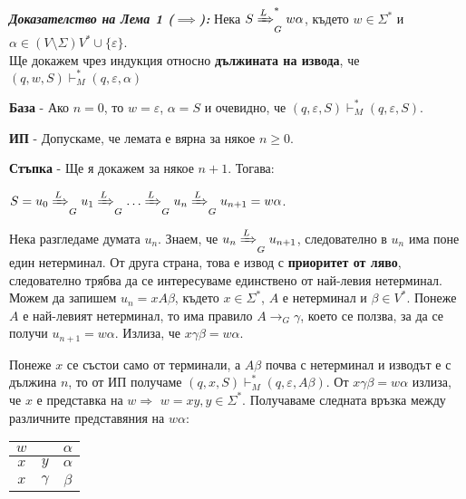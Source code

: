 \documentclass[fleqn,12pt]{article}
\begin{document}
\noindent\textit{\textbf{Доказателство на Лема 1 ($\implies$):}} 
Нека $S \xRightarrow[]{L}_G^* w\alpha$, където $w \in \Sigma^*$ и $\alpha \in (V \setminus \Sigma) V^* \cup \{\varepsilon\}$. \\
Ще докажем чрез индукция относно \textbf{дължината на извода}, че $(q, w, S) \vdash_M^* (q, \varepsilon, \alpha)$

\noindent\textbf{База} - Ако $n = 0$, то $w=\varepsilon$, $\alpha = S$ и очевидно, че $(q, \varepsilon, S) \vdash_M^* (q, \varepsilon, S)$.

\noindent\textbf{ИП} - Допускаме, че лемата е вярна за някое $n \geq 0$.

\noindent\textbf{Стъпка} - Ще я докажем за някое $n + 1$. Тогава:

$S = u_0 \xRightarrow[]{L}_G u_1 \xRightarrow[]{L}_G \dots \xRightarrow[]{L}_G u_n \xRightarrow[]{L}_G u_{n+1} = w\alpha$.

Нека разгледаме думата $u_n$. Знаем, че $u_n \xRightarrow[]{L}_G u_{n+1}$, следователно в $u_n$ има поне един нетерминал.
От друга страна, това е извод с \textbf{приоритет от ляво}, следователно трябва да се интересуваме единствено от най-левия нетерминал.
Можем да запишем $u_n = xA\beta$, където $x \in \Sigma^*$, $A$ е нетерминал и $\beta \in V^*$.
Понеже $A$ е най-левият нетерминал, то има правило $A \to_G \gamma$, което се ползва, за да се получи $u_{n+1} = w \alpha$. 
Излиза, че $x \gamma \beta = w \alpha$.

Понеже $x$ се състои само от терминали, а $A\beta$ почва с нетерминал и изводът е с дължина $n$, 
то от ИП получаме $(q, x, S) \vdash_M^* (q, \varepsilon, A\beta)$. От $x \gamma \beta = w \alpha$ излиза, че $x$ е представка на $w \Rightarrow$
$w = xy, y \in \Sigma^*$. Получаваме следната връзка между различните представяния на $w \alpha$:
\begin{center}
\begin{tabular}{ |c c c|}
    \hline
    \cellcolor[HTML]{00FF00} $w$ & \cellcolor[HTML]{00FF00}  & \cellcolor[HTML]{FF0000} $\alpha$ \\ 
    \hline
    \cellcolor[HTML]{00FF00} $x$ & \cellcolor[HTML]{00FF00} $y$ & \cellcolor[HTML]{FF0000} $\alpha$ \\  
    \hline
    \cellcolor[HTML]{FFFF00} $x$ & \cellcolor[HTML]{00FFFF} $\gamma$ & \cellcolor[HTML]{00FFFF} $\beta$   \\ 
    \hline
\end{tabular}
\end{center}
\end{document}
